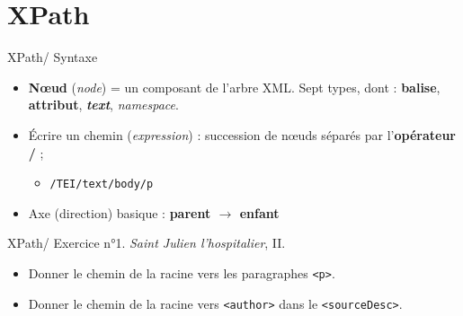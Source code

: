 \documentclass{beamer}
\begin{document}
    \section{XPath}
    
    \begin{frame}{XPath/ Syntaxe}
        \Large
        \begin{itemize}
            \item \textbf{N\oe ud} (\textit{node}) = un composant de l'arbre XML. Sept types, dont : \textbf{balise}, \textbf{attribut}, \textbf{\textit{text}}, \textit{namespace}.
            \bigskip
            \item Écrire un chemin (\textit{expression}) : succession de n\oe uds séparés par l'\textbf{opérateur /} ;
            \begin{itemize}
            \Large
                \item \texttt{/TEI/text/body/p}
            \end{itemize}
            \bigskip
            \item Axe (direction) basique : \textbf{parent $\rightarrow$ enfant}
        \end{itemize}
        
    \end{frame}
    
    \begin{frame}{XPath/ Exercice n°1. \textit{Saint Julien l'hospitalier}, II.}
        \Large
        \begin{itemize}
            \item Donner le chemin de la racine vers les paragraphes \texttt{<p>}.
            \bigskip
            \item Donner le chemin de la racine vers \texttt{<author>} dans le \texttt{<sourceDesc>}.
        \end{itemize}
    \end{frame}
\end{document}
